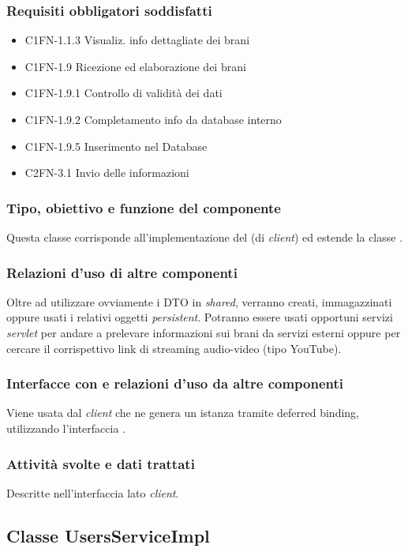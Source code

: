 \subsubsection*{Requisiti obbligatori soddisfatti}
\begin{itemize}
	\item C1FN-1.1.3 Visualiz. info dettagliate dei brani
	\item C1FN-1.9 Ricezione ed elaborazione dei brani
	\item C1FN-1.9.1 Controllo di validit\`a dei dati
	\item C1FN-1.9.2 Completamento info da database interno
	\item C1FN-1.9.5 Inserimento nel Database
	\item C2FN-3.1 Invio delle informazioni
\end{itemize}
\subsubsection*{Tipo, obiettivo e funzione del componente}
Questa classe corrisponde all'implementazione del  (di
\emph{client}) ed estende la classe .

\subsubsection*{Relazioni d'uso di altre componenti}
Oltre ad utilizzare ovviamente i DTO in \emph{shared}, verranno creati,
immagazzinati oppure usati i relativi oggetti \emph{persistent}.
Potranno essere usati opportuni servizi \emph{servlet} per andare a prelevare
informazioni sui brani da servizi esterni oppure per cercare il corrispettivo
link di streaming audio-video (tipo YouTube).

\subsubsection*{Interfacce con e relazioni d'uso da altre componenti}
Viene usata dal \emph{client} che ne genera un istanza tramite deferred binding,
utilizzando l'interfaccia .

\subsubsection*{Attivit\`a svolte e dati trattati}
Descritte nell'interfaccia lato \emph{client}.

\subsection{Classe UsersServiceImpl}

